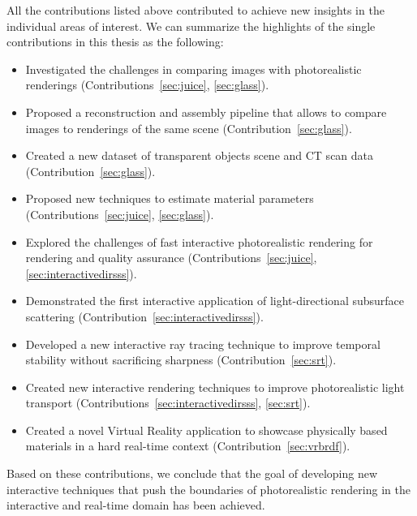 All the contributions listed above contributed to achieve new insights in the individual areas of interest. We can summarize the highlights of the single contributions in this thesis as the following: 
\label{sec:conclusion}
\begin{itemize}
\item Investigated the challenges in comparing images with photorealistic renderings (Contributions~\ref{sec:juice}, \ref{sec:glass}).
\item Proposed a reconstruction and assembly pipeline that allows to compare images to renderings of the same scene (Contribution~\ref{sec:glass}).
\item Created a new dataset of transparent objects scene and CT scan data (Contribution~\ref{sec:glass}).
\item Proposed new techniques to estimate material parameters (Contributions~\ref{sec:juice}, \ref{sec:glass}).
\item Explored the challenges of fast interactive photorealistic rendering for rendering and quality assurance (Contributions~\ref{sec:juice},\ref{sec:interactivedirsss}).
\item Demonstrated the first interactive application of light-directional subsurface scattering (Contribution~\ref{sec:interactivedirsss}).
\item Developed a new interactive ray tracing technique to improve temporal stability without sacrificing sharpness (Contribution~\ref{sec:srt}).
\item Created new interactive rendering techniques to improve photorealistic light transport (Contributions~\ref{sec:interactivedirsss}, \ref{sec:srt}).
\item Created a novel Virtual Reality application to showcase physically based materials in a hard real-time context (Contribution~\ref{sec:vrbrdf}).
\end{itemize}

Based on these contributions, we conclude that the goal of developing new interactive techniques that push the boundaries of photorealistic rendering in the interactive and real-time domain has been achieved. 